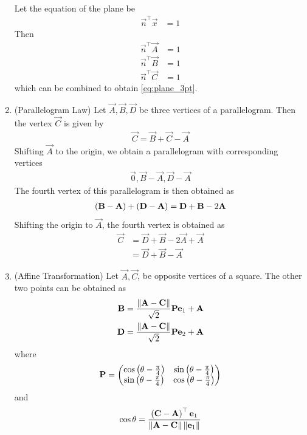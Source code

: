 \documentclass[journal,12pt,twocolumn]{IEEEtran}
\renewcommand\thesection{\arabic{section}}
\renewcommand\thesubsection{\thesection.\arabic{subsection}}
\begin{document}
\begin{enumerate}[label=\thesubsection.\arabic*.,ref=\thesubsection.\theenumi]
\begin{align}
	\label{eq:plane_3pt}
\end{align}
\solution Let the equation of the plane be 
\begin{align}
	\vec{n}^{\top}	\vec{x} &= 1
\end{align}
Then 
\begin{align}
	\vec{n}^{\top}	\vec{A} &= 1
	\\
	\vec{n}^{\top}	\vec{B} &= 1
	\\
	\vec{n}^{\top}	\vec{C} &= 1
\end{align}
which can be combined to obtain 
	\eqref{eq:plane_3pt}.
%
\item (Parallelogram Law)  Let $\vec{A}, \vec{B}, \vec{D}$ be three vertices of a parallelogram.  Then the vertex $\vec{C}$ is given by 
\begin{align}
  \label{eq:pgm_law}
  \vec{C} = \vec{B}+\vec{C} - \vec{A}
\end{align}
		\solution Shifting $\vec{A}$ to the origin, we obtain a parallelogram with corresponding vertices 
\begin{align}
  \label{eq:pgm_law_org_vert}
  \vec{0}, \vec{B}-\vec{A}, \vec{D} - \vec{A}
\end{align}
The fourth vertex of this parallelogram is then obtained as 
\begin{align}
  \label{eq:pgm_law_org}
	\left(\mathbf{B}-\mathbf{A}\right)+\left( \mathbf{D} - \mathbf{A}\right) = \mathbf{D}+ \mathbf{B} - 2\mathbf{A}
\end{align}
Shifting the origin to $\vec{A}$, the fourth vertex is obtained as 
\begin{align}
  \label{eq:pgm_law_org_C}
		 \vec{C} &= \vec{D}+ \vec{B} - 2\vec{A}+\vec{A} 
		 \\
	 &=
	 \vec{D}+ \vec{B} - \vec{A} 
\end{align}
\item (Affine Transformation) Let $\vec{A},\vec{C}$, be opposite vertices of a square. The other two points can be obtained as  
\begin{align}
  \label{eq:square_points}
  \mathbf{B} = \frac{\left\lVert\mathbf{A}-\mathbf{C}\right\rVert}{\sqrt{2}} \mathbf{P}\mathbf{e}_1+\mathbf{A}
  \\
  \mathbf{D} = \frac{\left\lVert\mathbf{A}-\mathbf{C}\right\rVert}{\sqrt{2}} \mathbf{P}\mathbf{e}_2+\mathbf{A}
\end{align}
where 
\begin{align}
	\mathbf{P} = \begin{pmatrix}\cos \left(\theta-\frac{\pi}{4}\right) & \sin  \left(\theta-\frac{\pi}{4}\right) \\ \sin \left(\theta-\frac{\pi}{4}\right) & \cos \left(\theta-\frac{\pi}{4}\right)\end{pmatrix}
\end{align}
and 
\begin{align}
	\cos\theta = \frac{\left(\mathbf{C}-\mathbf{A}\right)^{\top}\mathbf{e}_1}{\left\lVert\mathbf{A}-\mathbf{C}\right\rVert\left\lVert\mathbf{e}_1\right\rVert}
\end{align}
\end{enumerate}
\end{document}
